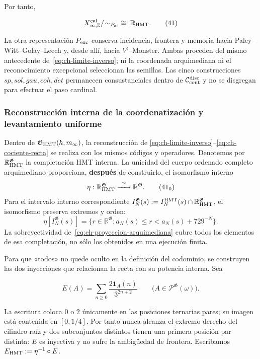 Por tanto,

\[
 X_{\infty,\mathbb Z}^{\rm cal}/\!\sim_{P_{\rm ar}}
 \;\cong\;\mathbb R_{\rm HMT}.
\tag{41}\label{eq:ch-cociente-recta}
\]

La otra representación \(P_{\rm exc}\) conserva incidencia, frontera y memoria
hacia Paley--Witt--Golay--Leech y, desde allí, hacia
\(V^\natural\)--Monster. Ambas proceden del
mismo antecedente de~\eqref{eq:ch-limite-inverso}; ni la coordenada arquimediana ni el reconocimiento
excepcional seleccionan las semillas. Las cinco construcciones
\(sp,sol,gau,coh,det\) permanecen consustanciales dentro de
\(\mathcal C_{\rm cont}^{\rm disc}\) y no se disgregan para efectuar el paso
cardinal.



\subsubsection{Reconstrucción interna de la coordenatización y levantamiento uniforme}

Dentro de \(\mathfrak G_{\rm HMT}(h,m_\infty)\), la reconstrucción de
\eqref{eq:ch-limite-inverso}--\eqref{eq:ch-cociente-recta} se realiza con los mismos códigos y operadores. Denotemos por
\(\mathbb R_{\rm HMT}^{\mathfrak G}\) la completación HMT interna. La
unicidad del cuerpo ordenado completo arquimediano proporciona, \textbf{después} de
construirlo, el isomorfismo interno
\[
 \eta:\mathbb R_{\rm HMT}^{\mathfrak G}
 \xrightarrow{\ \cong\ }\mathbb R^{\mathfrak G}.
\tag{41$_0$}\label{eq:ch-isomorfismo-interno}
\]
Para el intervalo interno correspondiente
\(I_N^{\mathfrak G}(s):=
 I_N^{\rm HMT}(s)\cap\mathbb R_{\rm HMT}^{\mathfrak G}\), el isomorfismo
preserva extremos y orden:
\[
 \eta[I_N^{\mathfrak G}(s)]
 =\{r\in\mathbb R^{\mathfrak G}:
      a_N(s)\le r<a_N(s)+729^{-N}\}.
\tag{41$_0$a}\label{eq:ch-intervalos-internos}
\]
La sobreyectividad de~\eqref{eq:ch-proyeccion-arquimediana} cubre todos los elementos de esa completación, no
sólo los obtenidos en una ejecución finita.

Para que «todos» no quede oculto en la definición del codominio, se construyen
las dos inyecciones que relacionan la recta con su potencia interna. Sea

\[
 E(A)=\sum_{n\ge0}\frac{2\mathbf1_A(n)}{3^{2n+2}}
 \qquad
 \bigl(A\in\mathcal P^{\mathfrak G}(\omega)\bigr).
\tag{41a}\label{eq:ch-incrustacion-cantor}
\]

La escritura coloca \(0\) o \(2\) únicamente en las posiciones ternarias
pares; su imagen está contenida en \([0,1/4]\). Por tanto nunca alcanza el
extremo derecho del cilindro raíz y dos subconjuntos distintos tienen una
primera posición par distinta: \(E\) es inyectiva y no sufre la ambigüedad de
frontera. Escribamos \(E_{\rm HMT}:=\eta^{-1}\circ E\).

